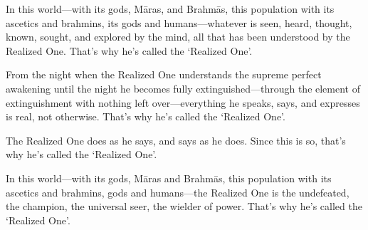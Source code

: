 \documentclass[12pt,openany]{book}%
\begin{document}
In this world—with its gods, \textsanskrit{Māras}, and \textsanskrit{Brahmās}, this population with its ascetics and brahmins, its gods and humans—whatever is seen, heard, thought, known, sought, and explored by the mind, all that has been understood by the Realized One. That’s why he’s called the ‘Realized One’. 

From the night when the Realized One understands the supreme perfect awakening until the night he becomes fully extinguished—through the element of extinguishment with nothing left over—everything he speaks, says, and expresses is real, not otherwise. That’s why he’s called the ‘Realized One’. 

The Realized One does as he says, and says as he does. Since this is so, that’s why he’s called the ‘Realized One’. 

In this world—with its gods, \textsanskrit{Māras} and \textsanskrit{Brahmās}, this population with its ascetics and brahmins, gods and humans—the Realized One is the undefeated, the champion, the universal seer, the wielder of power. That’s why he’s called the ‘Realized One’. 
\end{document}
